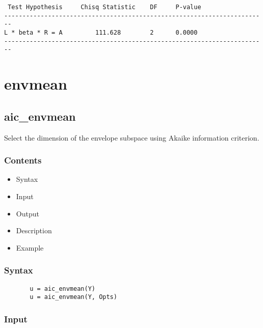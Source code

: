 \documentclass[a4paper,11pt,openany]{memoir}
\begin{document}
        \color{lightgray}\ttfamily \begin{verbatim}
 Test Hypothesis     Chisq Statistic    DF     P-value
------------------------------------------------------------------------
L * beta * R = A         111.628        2      0.0000
------------------------------------------------------------------------
\end{verbatim} \rmfamily
\color{black}
    
\newpage

\chapter{envmean}

    
\rmfamily
\color{black}\section{aic\_envmean}

\begin{par}
Select the dimension of the envelope subspace using Akaike information criterion.
\end{par} \vspace{1em}

\subsection*{Contents}

\begin{itemize}
\setlength{\itemsep}{-1ex}
   \item Syntax
   \item Input
   \item Output
   \item Description
   \item Example
\end{itemize}


\subsection*{Syntax}


\begin{verbatim}       u = aic_envmean(Y)
       u = aic_envmean(Y, Opts)\end{verbatim}
    

\subsection*{Input}
\end{document}
